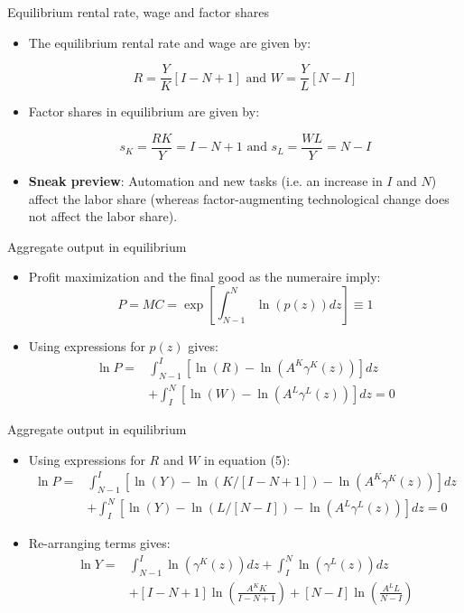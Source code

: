 \documentclass[notes=show]{beamer}
\begin{document}
\begin{frame}{Equilibrium rental rate, wage and factor shares}
\begin{itemize}
\item The equilibrium rental rate and wage are given by:
\begin{tcolorbox}
\[
R = \frac{Y}{K}[I-N+1] \text{ and }  W = \frac{Y}{L}[N-I] \tag{5} \label{eq5}
\]
\end{tcolorbox}
\item Factor shares in equilibrium are given by:
\begin{tcolorbox}
\[
s_{K} = \frac{RK}{Y} = I-N+1 \text{ and }  s_{L} = \frac{WL}{Y} = N-I  \tag{6} \label{eq6}
\]
\end{tcolorbox}
\item \textbf{Sneak preview}: Automation and new tasks (i.e. an increase in $I$ and $N$) affect the labor share (whereas factor-augmenting technological change does not affect the labor share).
\end{itemize}
\end{frame}

\begin{frame}{Aggregate output in equilibrium}
\begin{itemize}
\item Profit maximization and the final good as the numeraire imply:
\[
P = MC = \exp \left[ \int_{N-1}^{N} \ln(p(z))dz \right] \equiv 1
\]
\item Using expressions for $p(z)$ gives:
\begin{align*}
\ln P = & \int_{N-1}^{I} [\ln(R) - \ln(A^{K}\gamma^{K}(z))]dz \\
& + \int_{I}^{N} [\ln(W) - \ln(A^{L}\gamma^{L}(z))]dz = 0
\end{align*}
\end{itemize}
\end{frame}

\begin{frame}{Aggregate output in equilibrium}
\begin{itemize}
\item Using expressions for $R$ and $W$ in equation (5):
\begin{align*}
\ln P = & \int_{N-1}^{I} [\ln(Y) - \ln(K/[I-N+1]) - \ln(A^{K}\gamma^{K}(z))]dz \\
& + \int_{I}^{N} [\ln(Y) - \ln(L/[N-I]) - \ln(A^{L}\gamma^{L}(z))]dz = 0
\end{align*}
\item Re-arranging terms gives:
\begin{align*}
\ln Y = & \int_{N-1}^{I} \ln(\gamma^{K}(z))dz + \int_{I}^{N} \ln(\gamma^{L}(z))dz \\
& + [I-N+1] \ln(\frac{A^{K}K}{I-N+1}) + [N-I] \ln(\frac{A^{L}L}{N-I})
\end{align*}
\end{itemize}
\end{frame}
\end{document}
